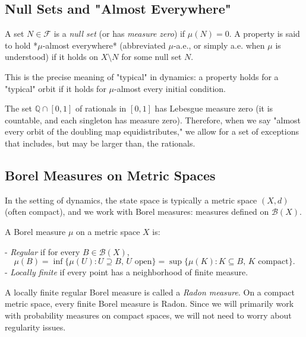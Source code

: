 \subsection{Null Sets and "Almost Everywhere"}\label{sec:7.3.4}

\begin{definition}\label{def:7.16.}
A set $N \in \mathcal{F}$ is a \textit{null set} (or has \textit{measure zero}) if $\mu(N) = 0$. A property is said to hold *$\mu$-almost everywhere* (abbreviated $\mu$-a.e., or simply a.e. when $\mu$ is understood) if it holds on $X \setminus N$ for some null set $N$.

This is the precise meaning of "typical" in dynamics: a property holds for a "typical" orbit if it holds for $\mu$-almost every initial condition.
\end{definition}


\begin{example}
The set $\mathbb{Q} \cap [0,1]$ of rationals in $[0,1]$ has Lebesgue measure zero (it is countable, and each singleton has measure zero). Therefore, when we say "almost every orbit of the doubling map equidistributes," we allow for a set of exceptions that includes, but may be larger than, the rationals.
\end{example}


\subsection{Borel Measures on Metric Spaces}\label{sec:7.3.5}

In the setting of dynamics, the state space is typically a metric space $(X, d)$ (often compact), and we work with Borel measures: measures defined on $\mathcal{B}(X)$.

\begin{definition}\label{def:7.18.}
A Borel measure $\mu$ on a metric space $X$ is:

- \textit{Regular} if for every $B \in \mathcal{B}(X)$,
\[
\mu(B) = \inf\{\mu(U) : U \supseteq B, \, U \text{ open}\} = \sup\{\mu(K) : K \subseteq B, \, K \text{ compact}\}.
\]
- \textit{Locally finite} if every point has a neighborhood of finite measure.

A locally finite regular Borel measure is called a \textit{Radon measure}. On a compact metric space, every finite Borel measure is Radon. Since we will primarily work with probability measures on compact spaces, we will not need to worry about regularity issues.


\bigskip

\end{definition}


